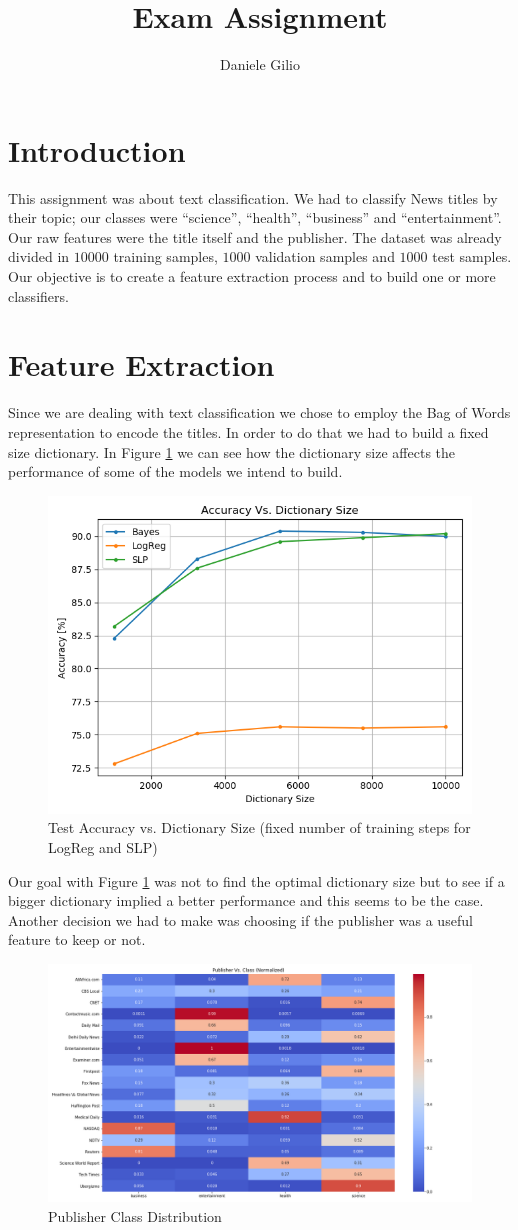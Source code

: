 \documentclass[10pt,a4paper]{report}
\author{Daniele Gilio}
\title{Exam Assignment}
\begin{document}
\maketitle
\section{Introduction}
This assignment was about text classification. We had to classify News titles by their topic; our classes were \enquote{science}, \enquote{health}, \enquote{business} and \enquote{entertainment}. Our raw features were the title itself and the publisher. The dataset was already divided in $10000$ training samples, $1000$ validation samples and $1000$ test samples. Our objective is to create a feature extraction process and to build one or more classifiers.
\section{Feature Extraction}
Since we are dealing with text classification we chose to employ the Bag of Words representation to encode the titles. In order to do that we had to build a fixed size dictionary. In Figure \ref{fig:acc_vs_dic} we can see how the dictionary size affects the performance of some of the models we intend to build.
\begin{figure}[!ht]
\centering
\includegraphics[width=0.5\linewidth]{acc_vs_dic.png}
\caption{Test Accuracy vs. Dictionary Size (fixed number of training steps for LogReg and SLP)}
\label{fig:acc_vs_dic}
\end{figure}
Our goal with Figure \ref{fig:acc_vs_dic} was not to find the optimal dictionary size but to see if a bigger dictionary implied a better performance and this seems to be the case. Another decision we had to make was choosing if the publisher was a useful feature to keep or not. 
\begin{figure}[!ht]
\centering
\includegraphics[width=0.8\linewidth]{pub_vs_class.png}
\caption{Publisher Class Distribution}
\label{fig:pub_vs_class}
\end{figure}
\end{document}
